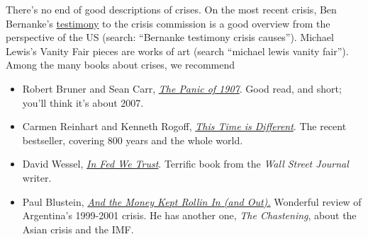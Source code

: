 There's no end of good descriptions of crises.
On the most recent crisis, Ben Bernanke's 
\href{http://www.federalreserve.gov/newsevents/testimony/Bernanke20100902a.htm}
{testimony} to the crisis commission is a good overview
from the perspective of the US
(search:  ``Bernanke
 testimony crisis causes'').
Michael Lewis's Vanity Fair pieces are works of art
(search ``michael lewis vanity fair'').
Among the many books about crises, we recommend
%
\begin{itemize}
\item Robert Bruner and Sean Carr,
\href{http://www.amazon.com/Panic-1907-Lessons-Learned-Markets/dp/0470452587/}
{\it The Panic of 1907\/}.
Good read, and short; you'll think it's about 2007.

\item Carmen Reinhart and Kenneth Rogoff,
\href{http://www.amazon.com/This-Time-Different-Centuries-ebook/dp/B004EYT932/}
{\it This Time is Different\/}.
The recent bestseller, covering 800 years and the whole world.

\item David Wessel,
\href{http://www.amazon.com/Fed-We-Trust-Bernankes-Great/dp/0307459683/}
{\it In Fed We Trust\/}.
Terrific book from the \emph{Wall Street Journal} writer.

\item Paul Blustein,
\href{http://www.amazon.com/dp/1586483811/}    
    {\it And the Money Kept Rollin In (and Out).\/}
    Wonderful review of Argentina's 1999-2001 crisis.
    He has another one, {\it The Chastening\/}, about the Asian crisis
    and the IMF.

\end{itemize}
